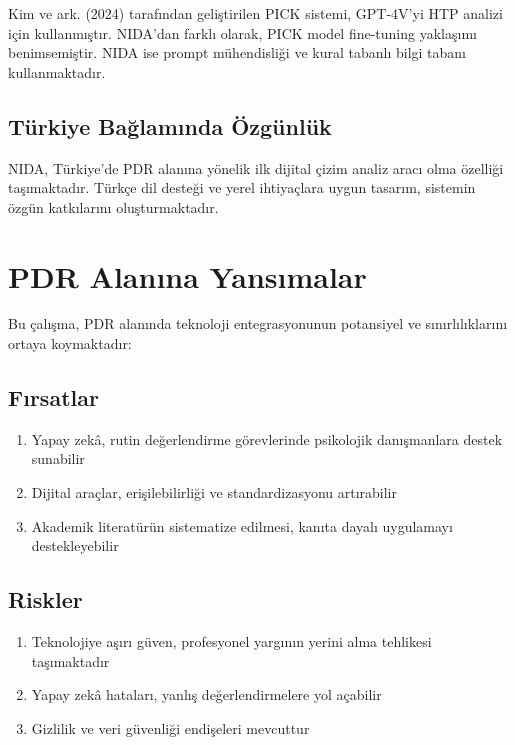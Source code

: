 Kim ve ark. (2024) tarafından geliştirilen PICK sistemi, GPT-4V'yi HTP analizi için kullanmıştır. NIDA'dan farklı olarak, PICK model fine-tuning yaklaşımı benimsemiştir. NIDA ise prompt mühendisliği ve kural tabanlı bilgi tabanı kullanmaktadır.

\subsection{Türkiye Bağlamında Özgünlük}

NIDA, Türkiye'de PDR alanına yönelik ilk dijital çizim analiz aracı olma özelliği taşımaktadır. Türkçe dil desteği ve yerel ihtiyaçlara uygun tasarım, sistemin özgün katkılarını oluşturmaktadır.

\section{PDR Alanına Yansımalar}

Bu çalışma, PDR alanında teknoloji entegrasyonunun potansiyel ve sınırlılıklarını ortaya koymaktadır:

\subsection{Fırsatlar}

\begin{enumerate}
  \item Yapay zekâ, rutin değerlendirme görevlerinde psikolojik danışmanlara destek sunabilir
  \item Dijital araçlar, erişilebilirliği ve standardizasyonu artırabilir
  \item Akademik literatürün sistematize edilmesi, kanıta dayalı uygulamayı destekleyebilir
\end{enumerate}

\subsection{Riskler}

\begin{enumerate}
  \item Teknolojiye aşırı güven, profesyonel yargının yerini alma tehlikesi taşımaktadır
  \item Yapay zekâ hataları, yanlış değerlendirmelere yol açabilir
  \item Gizlilik ve veri güvenliği endişeleri mevcuttur
\end{enumerate}

